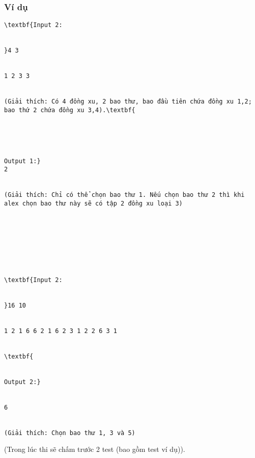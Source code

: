 \subsubsection{   Ví dụ  }
\begin{verbatim}
\textbf{Input 2:


}4 3


1 2 3 3


(Giải thích: Có 4 đồng xu, 2 bao thư, bao đầu tiên chứa đồng xu 1,2; bao thứ 2 chứa đồng xu 3,4).\textbf{





Output 1:}
2


(Giải thích: Chỉ có thể chọn bao thư 1. Nếu chọn bao thư 2 thì khi alex chọn bao thư này sẽ có tập 2 đồng xu loại 3)








\textbf{Input 2:


}16 10


1 2 1 6 6 2 1 6 2 3 1 2 2 6 3 1


\textbf{


Output 2:}


6


(Giải thích: Chọn bao thư 1, 3 và 5)\end{verbatim}

(Trong lúc thi sẽ chấm trước 2 test (bao gồm test ví dụ)).
